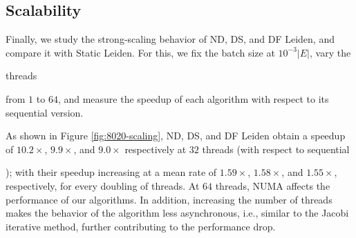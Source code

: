 \subsection{Scalability}

Finally, we study the strong-scaling behavior of ND, DS, and DF Leiden, and compare it with Static Leiden. For this, we fix the batch size at $10^{-3} |E|$, vary the threads from $1$ to $64$, and measure the speedup of each algorithm with respect to its sequential version.

As shown in Figure \ref{fig:8020-scaling}, ND, DS, and DF Leiden obtain a speedup of $10.2\times$, $9.9\times$, and $9.0\times$ respectively at $32$ threads (with respect to sequential); with their speedup increasing at a mean rate of $1.59\times$, $1.58\times$, and $1.55\times$, respectively, for every doubling of threads. At $64$ threads, NUMA affects the performance of our algorithms. In addition, increasing the number of threads makes the behavior of the algorithm less asynchronous, i.e., similar to the Jacobi iterative method, further contributing to the performance drop.











